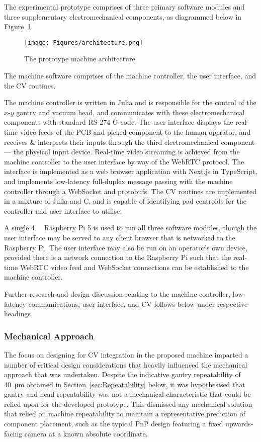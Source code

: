 \documentclass[12pt,british,UKenglish]{article}
\begin{document}
The experimental prototype comprises of three primary software modules and three supplementary electromechanical components, as diagrammed below in Figure~\ref{fig:architecture}.
\begin{figure}[hbtp]
    \texttt{[image: Figures/architecture.png]}
    \centering
    \caption{The prototype machine architecture.}
    \label{fig:architecture}
\end{figure}
The machine software comprises of the machine controller, the user interface, and the \ac{CV} routines.

The machine controller is written in Julia and is responsible for the control of the $x$-$y$ gantry and vacuum head, and communicates with these electromechanical components with standard RS-274 G-code.
The user interface displays the real-time video feeds of the \ac{PCB} and picked component to the human operator, and receives \& interprets their inputs through the third electromechanical component — the physical input device.
Real-time video streaming is achieved from the machine controller to the user interface by way of the \ac*{WebRTC} protocol.
The interface is implemented as a web browser application with Next.js in TypeScript, and implements low-latency full-duplex message passing with the machine controller through a WebSocket and \acfp*{protobuf}.
The \ac{CV} routines are implemented in a mixture of Julia and C, and is capable of identifying pad centroids for the controller and user interface to utilise.

A single \qty{4}{\giga\byte} Raspberry Pi 5 is used to run all three software modules, though the user interface may be served to any client browser that is networked to the Raspberry Pi.
The user interface may also be run on an operator's own device, provided there is a network connection to the Raspberry Pi such that the real-time \ac*{WebRTC} video feed and WebSocket connections can be established to the machine controller.

Further research and design discussion relating to the machine controller, low-latency communications, user interface, and \ac*{CV} follows below under respective headings.

\subsubsection{Mechanical Approach}\label{sec:Mechanical-Approach}

The focus on designing for \acl{CV} integration in the proposed machine imparted a number of critical design considerations that heavily influenced the mechanical approach that was undertaken.
Despite the indicative gantry repeatability of \qty{40}{\micro\metre} obtained in Section~\ref{sec:Repeatability} below, it was hypothesised that gantry and head repeatability was not a mechanical characteristic that could be relied upon for the developed prototype.
This dismissed any mechanical solution that relied on machine repeatability to maintain a representative prediction of component placement, such as the typical \ac{PnP} design featuring a fixed upwards-facing camera at a known absolute coordinate.
\end{document}
